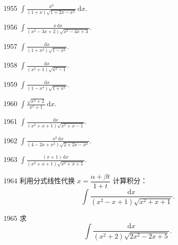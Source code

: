 \begin{prob}[S]{1955}
$\displaystyle \int \frac{x^3}{(1 + x)\sqrt{1 + 2x - x^2}}\,\mathrm{d}x$.
\end{prob}

\begin{prob}[S]{1956}
$\displaystyle \int \frac{x\,\mathrm{d}x}{(x^2 - 3x + 2)\sqrt{x^2 - 4x + 3}}$.
\end{prob}

\begin{prob}[S]{1957}
$\displaystyle \int \frac{\mathrm{d}x}{(1 + x^2)\sqrt{1 - x^2}}$.
\end{prob}

\begin{prob}[S]{1958}
$\displaystyle \int \frac{\mathrm{d}x}{(x^2 + 1)\sqrt{x^2 - 1}}$.
\end{prob}

\begin{prob}[S]{1959}
$\displaystyle \int \frac{\mathrm{d}x}{(1 - x^4)\sqrt{1 + x^2}}$.
\end{prob}

\begin{prob}[S]{1960}
$\displaystyle \int \frac{\sqrt{x^2 + 2}}{x^2 + 1}\,\mathrm{d}x$.
\end{prob}


\begin{prob}[S]{1961}
$\displaystyle \int \frac{\mathrm{d}x}{(x^2 + x + 1)\sqrt{x^2 + x - 1}}$.
\end{prob}

\begin{prob}[S]{1962}
$\displaystyle \int \frac{x^2\,\mathrm{d}x}{(4 - 2x + x^2)\sqrt{2 + 2x - x^2}}$.
\end{prob}

\begin{prob}[S]{1963}
$\displaystyle \int \frac{(x + 1)\,\mathrm{d}x}{(x^2 + x + 1)\sqrt{x^2 + x + 1}}$.
\end{prob}

\begin{prob}[M]{1964}
利用分式线性代换 $x = \dfrac{\alpha + \beta t}{1 + t}$ 计算积分：
\[
\int \frac{\mathrm{d}x}{(x^2 - x + 1)\sqrt{x^2 + x + 1}}.
\]
\end{prob}

\begin{prob}[M]{1965}
求
\[
\int \frac{\mathrm{d}x}{(x^2 + 2)\sqrt{2x^2 - 2x + 5}}.
\]
\end{prob}

